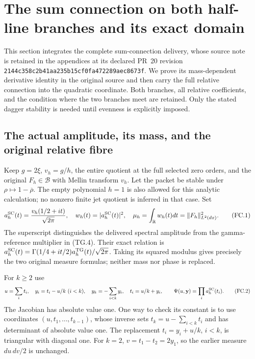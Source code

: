 \section{The sum connection on both half-line branches and its exact domain}
\label{sec:sum-connection-stieltjes}

This section integrates the complete sum-connection delivery, whose
source note is retained in the appendices at its declared PR~20 revision
\nolinkurl{2144c358c2b41aa235b15cf0fa472289aec8673f}. We prove its
mass-dependent derivative identity in the original source and then carry
the full relative connection into the quadratic coordinate. Both branches,
all relative coefficients, and the condition where the two branches meet
are retained. Only the stated dagger stability is needed until evenness
is explicitly imposed.

\subsection{The actual amplitude, its mass, and the original relative fibre}

Keep \(g=2\xi\), \(v_h=g/h\), the entire quotient at the full selected
zero orders, and the original \(F_h\in\mathscr B\) with Mellin transform
\(v_h\). Let the packet be stable under \(\rho\mapsto1-\overline\rho\).
The empty polynomial \(h=1\) is also allowed for this analytic calculation;
no nonzero finite jet quotient is inferred in that case. Set
\[
 a_h^{\rm SC}(t)=\frac{v_h(1/2+it)}{\sqrt{2\pi}},\quad
 w_h(t)=|a_h^{\rm SC}(t)|^2,\quad
 \mu_h=\int_{\mathbb R}w_h(t)dt=\|F_h\|_{L^2(dx)}^2.
 \tag{FC.1}
\]
The superscript distinguishes the delivered spectral amplitude from
the gamma-reference multiplier in (TG.4). Their exact relation is
\(a_h^{\rm SC}(t)=\Gamma(1/4+it/2)a_h^{\rm TG}(t)/\sqrt{2\pi}\).
Taking its squared modulus gives precisely the two original measure
formulas; neither mass nor phase is replaced.

For \(k\ge2\) use
\[
 u=\sum_i t_i,\quad y_i=t_i-u/k\ (i<k),\quad
 y_k=-\sum_{i<k}y_i,\quad t_i=u/k+y_i,
 \qquad \Psi(u,\mathbf y)=\prod_i a_h^{\rm SC}(t_i).
 \tag{FC.2}
\]
The Jacobian has absolute value one. One way to check its constant
is to use coordinates \((u,t_1,\ldots,t_{k-1})\), whose inverse
sets \(t_k=u-\sum_{i<k}t_i\) and has determinant of absolute
value one. The replacement \(t_i=y_i+u/k\), \(i<k\), is triangular
with diagonal one. For \(k=2\), \(v=t_1-t_2=2y_1\), so the
earlier measure \(du\,dv/2\) is unchanged.

